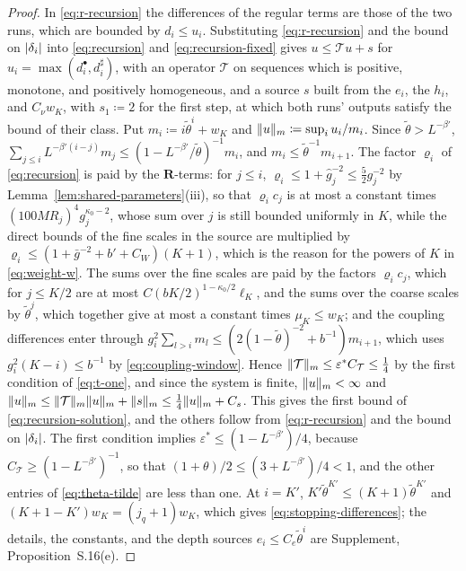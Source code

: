 \documentclass[11pt]{preprint}
\DeclarePairedDelimiter{\abs}{\lvert}{\rvert}
\DeclarePairedDelimiter{\norm}{\lVert}{\rVert}
\numberwithin{equation}{section}
\theoremstyle{definition}
\theoremstyle{remark}
\theoremstyle{plain}
\begin{document}
\begin{proof}
In \eqref{eq:r-recursion} the differences of the regular terms are those of the two runs, which are bounded by $d_i \leq u_i$. Substituting \eqref{eq:r-recursion} and the bound on $\abs{\delta_i}$ into \eqref{eq:recursion} and \eqref{eq:recursion-fixed} gives $u \leq \mathcal Tu + s$ for $u_i = \max(d^\bullet_i, d^\sharp_i)$, with an operator $\mathcal T$ on sequences which is positive, monotone, and positively homogeneous, and a source $s$ built from the $e_i$, the $h_i$, and $C_\nu w_K$, with $s_1 \coloneqq 2$ for the first step, at which both runs' outputs satisfy the bound of their class. Put $m_i \coloneqq i\tilde\theta^i + w_K$ and $\norm{u}_m \coloneqq \sup_iu_i/m_i$. Since $\tilde\theta > L^{-\beta'}$, $\sum_{j \leq i}L^{-\beta'(i-j)}m_j \leq (1 - L^{-\beta'}/\tilde\theta)^{-1}m_i$, and $m_i \leq \tilde\theta^{-1}m_{i+1}$. The factor $\varrho_i$ of \eqref{eq:recursion} is paid by the $\mathbf R$-terms: for $j \leq i$, $\varrho_i \leq 1 + \hat g_j^{-2} \leq \frac52g_j^{-2}$ by Lemma~\ref{lem:shared-parameters}(iii), so that $\varrho_ic_j$ is at most a constant times $(100MR_j)^4g_j^{\kappa_0-2}$, whose sum over $j$ is still bounded uniformly in $K$, while the direct bounds of the fine scales in the source are multiplied by $\varrho_i \leq (1 + \bar g^{-2} + b' + C_W)(K + 1)$, which is the reason for the powers of $K$ in \eqref{eq:weight-w}. The sums over the fine scales are paid by the factors $\varrho_ic_j$, which for $j \leq K/2$ are at most $C(bK/2)^{1-\kappa_0/2}\ell_K$, and the sums over the coarse scales by $\tilde\theta^j$, which together give at most a constant times $\mu_K \leq w_K$; and the coupling differences enter through $g_i^2\sum_{l > i}m_l \leq (2(1 - \tilde\theta)^{-2} + b^{-1})m_{i+1}$, which uses $g_i^2(K - i) \leq b^{-1}$ by \eqref{eq:coupling-window}. Hence $\norm{\mathcal T}_m \leq \varepsilon^*C_{\mathcal T} \leq \frac14$ by the first condition of \eqref{eq:t-one}, and since the system is finite, $\norm{u}_m < \infty$ and $\norm{u}_m \leq \norm{\mathcal T}_m\norm{u}_m + \norm{s}_m \leq \frac14\norm{u}_m + C_s$. This gives the first bound of \eqref{eq:recursion-solution}, and the others follow from \eqref{eq:r-recursion} and the bound on $\abs{\delta_i}$. The first condition implies $\varepsilon^* \leq (1 - L^{-\beta'})/4$, because $C_{\mathcal T} \geq (1 - L^{-\beta'})^{-1}$, so that $(1 + \theta)/2 \leq (3 + L^{-\beta'})/4 < 1$, and the other entries of \eqref{eq:theta-tilde} are less than one. At $i = K'$, $K'\tilde\theta^{K'} \leq (K + 1)\tilde\theta^{K'}$ and $(K + 1 - K')w_K = (j_q + 1)w_K$, which gives \eqref{eq:stopping-differences}; the details, the constants, and the depth sources $e_i \leq C_e\tilde\theta^i$ are Supplement, Proposition~S.16(e).
\end{proof}
\end{document}
